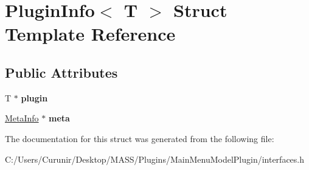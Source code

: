 \hypertarget{struct_plugin_info}{}\section{Plugin\+Info$<$ T $>$ Struct Template Reference}
\label{struct_plugin_info}
\subsection*{Public Attributes}
\begin{DoxyCompactItemize}
\item 
\mbox{\label{struct_plugin_info_a988245c24cc2fe6da1c0312b8835f803}} 
T $\ast$ {\bfseries plugin}
\item 
\mbox{\label{struct_plugin_info_a1f5e1a17fa1569bbdb2cc4bdcd7a5656}} 
\hyperlink{struct_meta_info}{Meta\+Info} $\ast$ {\bfseries meta}
\end{DoxyCompactItemize}


The documentation for this struct was generated from the following file\+:\begin{DoxyCompactItemize}
\item 
C\+:/\+Users/\+Curunir/\+Desktop/\+M\+A\+S\+S/\+Plugins/\+Main\+Menu\+Model\+Plugin/interfaces.\+h\end{DoxyCompactItemize}
